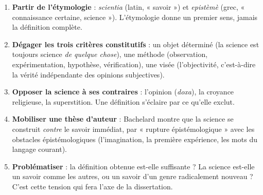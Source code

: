 \documentclass[11pt]{article}
\newcommand{\cle}[1]{{\popxbold\color{popdark}#1}}
\begin{document}
\begin{methode}
\begin{enumerate}
\item \textbf{Partir de l'étymologie} : \emph{scientia} (latin, « savoir ») et \emph{epistèmè} (grec, « connaissance certaine, science »). L'étymologie donne un premier sens, jamais la définition complète.
\item \textbf{Dégager les trois critères constitutifs} : un \cle{objet} déterminé (la science est toujours science \emph{de quelque chose}), une \cle{méthode} (observation, expérimentation, hypothèse, vérification), une \cle{visée} (l'\cle{objectivité}, c'est-à-dire la vérité indépendante des opinions subjectives).
\item \textbf{Opposer la science à ses contraires} : l'opinion (\emph{doxa}), la croyance religieuse, la superstition. Une définition s'éclaire par ce qu'elle exclut.
\item \textbf{Mobiliser une thèse d'auteur} : Bachelard montre que la science se construit \emph{contre} le savoir immédiat, par « \cle{rupture épistémologique} » avec les \cle{obstacles épistémologiques} (l'imagination, la première expérience, les mots du langage courant).
\item \textbf{Problématiser} : la définition obtenue est-elle suffisante ? La science est-elle un savoir comme les autres, ou un savoir d'un genre radicalement nouveau ? C'est cette tension qui fera l'axe de la dissertation.
\end{enumerate}
\end{methode}
\end{document}
